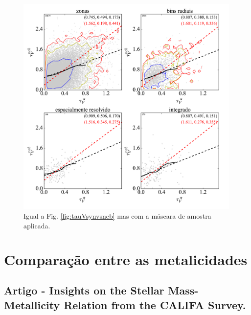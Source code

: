 \begin{figure}
	\centering
	\includegraphics[width=0.99\textwidth]{figuras/CompareTauV_realsample.pdf}
	\caption[Comparação entre os coeficientes de extinção (com máscara).]
	{Igual a Fig. \ref{fig:tauVsynvsneb} mas com a máscara de amostra aplicada.} 
	\label{fig:tauVsynvsnebMask}
\end{figure}


\section{Comparação entre as metalicidades}
\label{sec:synvsneb:Z}

\subsection{Artigo - Insights on the Stellar Mass-Metallicity Relation from the CALIFA Survey.}


